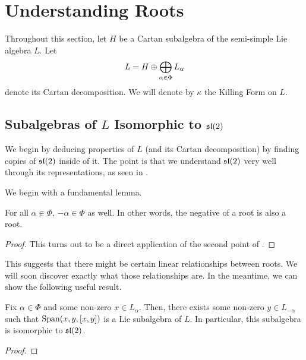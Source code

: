 \section{Understanding Roots}

Throughout this section, let $H$ be a Cartan subalgebra of the semi-simple Lie algebra $L$. Let
\begin{align*}
    L = H \+ \bigoplus_{\alpha \in \Phi} L_{\alpha}
\end{align*}
denote its Cartan decomposition. We will denote by $\kappa$ the Killing Form on $L$.

\subsection{Subalgebras of $L$ Isomorphic to $\sl{2}$}

We begin by deducing properties of $L$ (and its Cartan decomposition) by finding copies of $\sl{2}$ inside of it. The point is that we understand $\sl{2}$ very well through its representations, as seen in .


We begin with a fundamental lemma.

\begin{boxlemma}
    For all $\alpha \in \Phi$, $-\alpha \in \Phi$ as well. In other words, the negative of a root is also a root.
\end{boxlemma}
\begin{proof}
    This turns out to be a direct application of the second point of .
    \sorry
\end{proof}

This suggests that there might be certain linear relationships between roots. We will soon discover exactly what those relationships are. In the meantime, we can show the following useful result.

\begin{boxproposition}\label{Ch3:Prop:Exists_Subalg_Isom_to_sl2}
    Fix $\alpha \in \Phi$ and some non-zero $x \in L_{\alpha}$. Then, there exists some non-zero $y \in L_{-\alpha}$ such that $\Span{x, y, \brac{x, y}}$ is a Lie subalgebra of $L$. In particular, this subalgebra is isomorphic to $\sl{2}$.
\end{boxproposition}
\begin{proof}
    
\end{proof}

